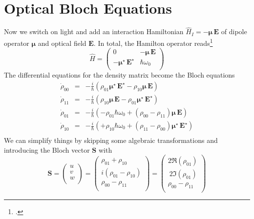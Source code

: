 \section{Optical Bloch Equations}

Now we switch on light and add an interaction Hamiltonian $\hat{H}_I = -\boldsymbol{\mu} \, \boldsymbol{E}$ of dipole operator $\boldsymbol{\mu} $ and optical field   $\boldsymbol{E}$. In total, the Hamilton operator reads\footcite[chap. 3.8]{Rand2016}
\[
 \hat{H } = \begin{pmatrix}
  0 & - {\boldsymbol{\mu}} \, \boldsymbol{E} \\ - {\boldsymbol{\mu}}^\star \, \boldsymbol{E}^\star & \hbar \omega_0 \\
 \end{pmatrix}
\]
The differential equations for the density matrix become the Bloch equations
\begin{eqnarray*}
\dot{\rho}_{00} &=&  - \frac{i}{\hbar} \left( \rho_{01} \boldsymbol{\mu}^\star \, \boldsymbol{E}^\star - \rho_{10} \boldsymbol{\mu} \, \boldsymbol{E} \right) \\
%
\dot{\rho}_{11} &=&  - \frac{i}{\hbar} \left( \rho_{10} \boldsymbol{\mu} \, \boldsymbol{E} - \rho_{01} \boldsymbol{\mu}^\star \, \boldsymbol{E}^\star \right) \\
%
\dot{\rho}_{01} &=& - \frac{i}{\hbar}  \left( - \rho_{01} \hbar \omega_0 + (\rho_{00} - \rho_{11})  \boldsymbol{\mu} \, \boldsymbol{E}\right) \\
%
\dot{\rho}_{10} &=& - \frac{i}{\hbar}  \left( + \rho_{10} \hbar \omega_0 + (\rho_{11} - \rho_{00})  \boldsymbol{\mu}^\star \, \boldsymbol{E}^\star \right) \\
%
\end{eqnarray*}
We can simplify things by skipping some algebraic transformations and introducing the Bloch vector $\boldsymbol{S}$ with
\[
\boldsymbol{S} = 
\begin{pmatrix}
u \\ v \\ w \\
\end{pmatrix}
= 
\begin{pmatrix}
\rho_{01} + \rho_{10} \\ i (\rho_{01} - \rho_{10}) \\ \rho_{00} - \rho_{11} \\
\end{pmatrix}
= 
\begin{pmatrix}
2 \Re (\rho_{01})  \\ \ 2 \Im (\rho_{01}) \\ \rho_{00} - \rho_{11} \\
\end{pmatrix}
\]

